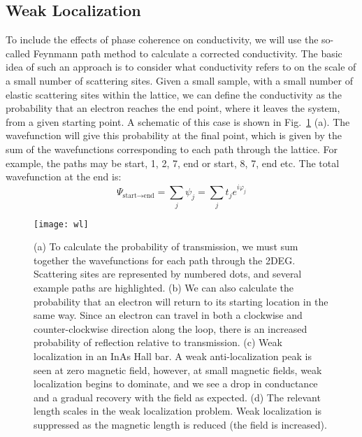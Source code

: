 \subsection{Weak Localization}
\label{sec:wl}
To include the effects of phase coherence on conductivity, we will use the so-called Feynmann path method to calculate
a corrected conductivity. The basic idea of such an approach is to consider what conductivity refers to on the scale of a small number of scattering sites. Given a small sample, with a small number of elastic scattering sites within the lattice,
we can define the conductivity as the probability that an electron reaches the end point, where it leaves the system,
from a given starting point. A schematic of this case is shown in Fig.~\ref{fig:WL} (a). The wavefunction will give this probability at the final point, which is given by the sum of the wavefunctions corresponding
to each path through the lattice. For example, the paths may be {start, 1, 2, 7, end} or {start, 8, 7, end} etc. The total wavefunction at the end is:
\begin{equation}
  \Psi_{\textrm{start}\rightarrow\textrm{end}} = \sum_j \psi_j = \sum_j t_j e^{i \varphi_j}
\end{equation}

\begin{figure}
  \texttt{[image: wl]}
  \caption[Weak localization]
  {\label{fig:WL}(a) To calculate the probability of transmission, we must sum together the wavefunctions for each path through the 2DEG. Scattering sites are represented by numbered dots, and several example paths are highlighted.
  (b) We can also calculate the probability that an electron will return to its starting location in the same way. Since an electron can travel in both a clockwise and counter-clockwise direction along the loop, there is an increased probability of reflection relative to transmission.
  (c) Weak localization in an InAs Hall bar. A weak anti-localization peak is seen at zero magnetic field, however, at small magnetic fields, weak localization begins to dominate, and we see a drop in conductance and a gradual recovery with the field as expected. (d) The relevant length scales in the weak localization problem. Weak localization is suppressed as the magnetic length is reduced (the field is increased).}
\end{figure}


